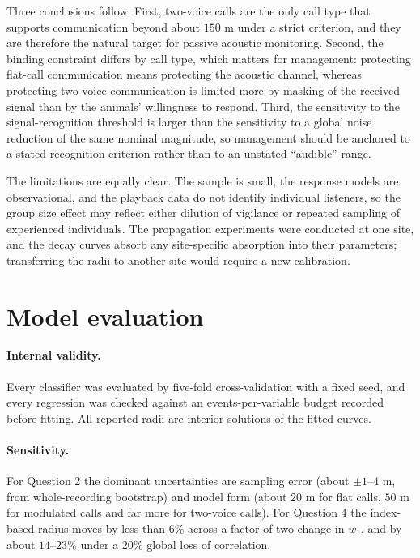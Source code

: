 \documentclass{apmcmthesis}
\begin{document}
Three conclusions follow. First, two-voice calls are the only call type that supports
communication beyond about $150$ m under a strict criterion, and they are therefore the
natural target for passive acoustic monitoring. Second, the binding constraint differs by
call type, which matters for management: protecting flat-call communication means
protecting the acoustic channel, whereas protecting two-voice communication is limited
more by masking of the received signal than by the animals' willingness to respond. Third,
the sensitivity to the signal-recognition threshold is larger than the sensitivity to a
global noise reduction of the same nominal magnitude, so management should be anchored to
a stated recognition criterion rather than to an unstated ``audible'' range.

The limitations are equally clear. The sample is small, the response models are
observational, and the playback data do not identify individual listeners, so the group
size effect may reflect either dilution of vigilance or repeated sampling of experienced
individuals. The propagation experiments were conducted at one site, and the decay curves
absorb any site-specific absorption into their parameters; transferring the radii to
another site would require a new calibration.

\section{Model evaluation}\label{sec:eval}

\paragraph{Internal validity.} Every classifier was evaluated by five-fold
cross-validation with a fixed seed, and every regression was checked against an
events-per-variable budget recorded before fitting. All reported radii are interior
solutions of the fitted curves.

\paragraph{Sensitivity.} For Question 2 the dominant uncertainties are sampling error
(about $\pm1$--$4$ m, from whole-recording bootstrap) and model form (about $20$ m for
flat calls, $50$ m for modulated calls and far more for two-voice calls). For Question 4
the index-based radius moves
by less than $6\%$ across a factor-of-two change in $w_1$, and by about $14$--$23\%$ under
a $20\%$ global loss of correlation.
\end{document}

